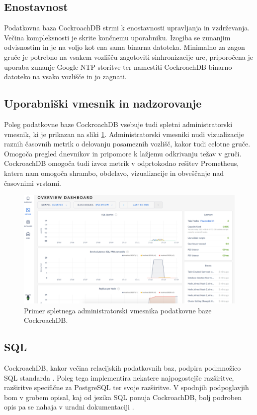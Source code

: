 \documentclass[a4paper, 12pt]{book}
\begin{document}
\subsection{Enostavnost}
Podatkovna baza CockroachDB strmi k enostavnosti upravljanja in vzdr\-že\-van\-ja. Večina kompleksnosti je skrite končnemu uporabniku. Izogiba se zunanjim odvisnostim in je na voljo kot ena sama binarna datoteka. Minimalno za zagon gruče je potrebno na vsakem vozlišču zagotoviti sinhronizacije ure, priporočena je uporaba zunanje Google NTP storitve ter namestiti CockroachDB binarno datoteko na vsako vozlišče in jo zagnati.

\subsection{Uporabniški vmesnik in nadzorovanje}
Poleg podatkovne baze CockroachDB vsebuje tudi spletni administratorski vmesnik, ki je prikazan na sliki \ref{img_crdb_admin_ui}. Administratorski vmesniki nudi vizualizacije raznih časovnih metrik o delovanju posameznih vozlišč, kakor tudi celotne gruče. Omogoča pregled dnevnikov in pripomore k lažjemu odkrivanju težav v gruči. CockroachDB omogoča tudi izvoz metrik v odprtokodno rešitev Prometheus, katera nam omogoča shrambo, obdelavo, vizualizacije in obveščanje nad časovnimi vrstami.

\begin{figure}[H]
\begin{center}
\includegraphics[width=1\textwidth]{resources/crdb_admin_ui.png}
\end{center}
\caption{Primer spletnega administratorski vmesnika podatkovne baze CockroachDB.}
\label{img_crdb_admin_ui}
\end{figure}

\subsection{SQL}
CockroachDB, kakor večina relacijskih podatkovnih baz, podpira podmnožico SQL standarda \cite{CRDB-sql-standard}. Poleg tega implementira nekatere najpogostejše raz\-ši\-rit\-ve, razširitve specifične za PostgreSQL ter svoje razširitve. V spodnjih podpoglavjih bom v grobem opisal, kaj od jezika SQL ponuja CockroachDB, bolj podroben opis pa se nahaja v uradni dokumentaciji \cite{CRDB-sql-features}.
\end{document}
